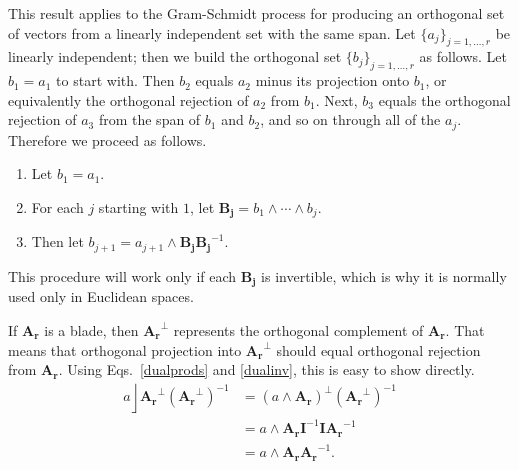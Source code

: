 \documentclass{utarticle}
\newcommand{\bl}[1]{\ensuremath{\bm{#1}}}
\newcommand{\I}{\bl{I}}
\DeclareMathOperator{\lin}{\rfloor}
\DeclareMathOperator{\out}{\wedge}
\newcommand{\dual}[1]{\ensuremath{#1^\perp}}
\begin{document}
This result applies to the Gram-Schmidt process for producing an orthogonal 
set of vectors from a linearly independent set with the same span.  Let $\{a_j\}_{j=1,\dotsc,r}$
be linearly independent; then we build the orthogonal set $\{b_j\}_{j=1,\dotsc,r}$
as follows.  Let $b_1 = a_1$ to start with. Then $b_2$ equals $a_2$ minus its 
projection onto $b_1$, or equivalently the orthogonal rejection of $a_2$ from $b_1$.
Next, $b_3$ equals the orthogonal rejection of $a_3$ from the span of $b_1$ and 
$b_2$, and so on through all of the $a_j$.  Therefore we proceed as follows.
\begin{enumerate}
\item Let $b_1 = a_1$.
\item For each $j$ starting with $1$, let $\bl{B_j} = b_1 \out \dotsb \out b_j$.
\item Then let $b_{j+1} = a_{j+1} \out \bl{B_j} \bl{B_j}^{-1}$.
\end{enumerate}
This procedure will work only if each \bl{B_j} is invertible, which is why it is normally used
only in Euclidean spaces.

If \bl{A_r} is a blade, then \dual{\bl{A_r}} represents the orthogonal complement of \bl{A_r}.  
That means that orthogonal projection into \dual{\bl{A_r}} should equal orthogonal 
rejection from \bl{A_r}.  Using Eqs.~\eqref{dualprods} and \eqref{dualinv}, this is easy to 
show directly.
\begin{align}
a \lin \dual{\bl{A_r}} (\dual{\bl{A_r}})^{-1} & = \dual{(a \out \bl{A_r})} (\dual{\bl{A_r}})^{-1} 
        \nonumber \\
 & = a \out \bl{A_r} \I^{-1} \I \bl{A_r}^{-1} \nonumber \\
 & = a \out \bl{A_r} \bl{A_r}^{-1}.
\end{align}
\end{document}
